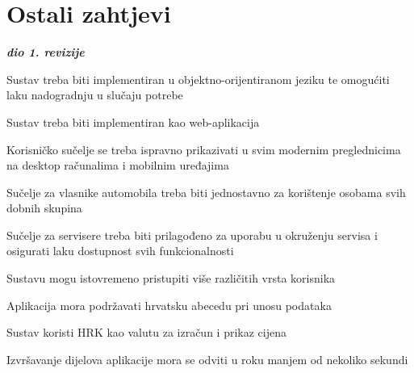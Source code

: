 \section{Ostali zahtjevi}

\textbf{\textit{dio 1. revizije}}\\

			 	\begin{packed_item}

                \item Sustav treba biti implementiran u objektno-orijentiranom jeziku te omogućiti laku nadogradnju u slučaju potrebe
                \item Sustav treba biti implementiran kao web-aplikacija
                \item Korisničko sučelje se treba ispravno prikazivati u svim modernim preglednicima na desktop računalima i mobilnim uređajima
                \item Sučelje za vlasnike automobila treba biti jednostavno za korištenje osobama svih dobnih skupina
                \item Sučelje za servisere treba biti prilagođeno za uporabu u okruženju servisa i osigurati laku dostupnost svih funkcionalnosti
			 	\item Sustavu mogu istovremeno pristupiti više različitih vrsta korisnika
			 	\item Aplikacija mora podržavati hrvatsku abecedu pri unosu podataka
			 	\item Sustav koristi HRK kao valutu za izračun i prikaz cijena
			 	\item Izvršavanje dijelova aplikacije mora se odviti u roku manjem od nekoliko sekundi

			 \end{packed_item}

